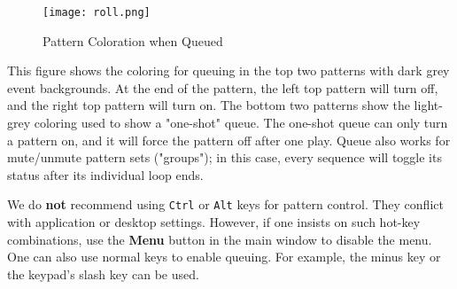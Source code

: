 \begin{figure}[H]
   \centering 
   \texttt{[image: roll.png]}
   \caption{Pattern Coloration when Queued}
   \label{fig:queueing_coloration}
\end{figure}

   This figure shows the coloring for queuing in the top two patterns with
   dark grey event backgrounds.  At the end of the pattern, the left top
   pattern will turn off, and the right top pattern will turn on.
   The bottom two patterns show the light-grey coloring used to show
   a "one-shot" queue.  The one-shot queue can only turn a pattern on, and it
   will force the pattern off after one play.
   Queue also works for mute/unmute pattern sets ("groups"); in this case,
   every sequence will toggle its status after its individual loop ends. 

   We do \textbf{not}
   recommend using \texttt{Ctrl} or \texttt{Alt}
   keys for pattern control.  They conflict with application or desktop
   settings.  However, if one insists on such hot-key combinations,
   use the \textbf{Menu} button in the main
   window to disable the menu.
   One can also use normal keys to enable queuing.
   For example, the minus key or the keypad's slash key can be used.


